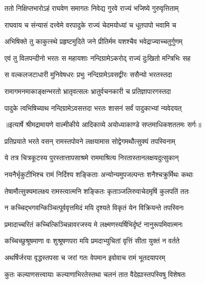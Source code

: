 \twolineshloka
{ततो निक्षिप्तभारोऽहं राघवेण समागतः}
{निवेद्य गुरवे राज्यं भजिष्ये गुरुवृत्तिताम्} %

\twolineshloka
{राघवाय च संन्यासं दत्त्वेमे वरपादुके}
{राज्यं चेदमयोध्यां च धूतपापो भवामि च} %

\twolineshloka
{अभिषिक्ते तु काकुत्स्थे प्रहृष्टमुदिते जने}
{प्रीतिर्मम यशश्चैव भवेद्राज्याच्चतुर्गुणम्} %

\twolineshloka
{एवं तु विलपन्दीनो भरतः स महायशाः}
{नन्दिग्रामेऽकरोद् राज्यं दुःखितो मन्त्रिभिः सह} %

\twolineshloka
{स वल्कलजटाधारी मुनिवेषधरः प्रभुः}
{नन्दिग्रामेऽवसद्वीरः ससैन्यो भरतस्तदा} %

\twolineshloka
{रामागमनमाकाङ्क्षन्भरतो भ्रातृवत्सलः}
{भ्रातुर्वचनकारी च प्रतिज्ञापारगस्तदा} %

\twolineshloka
{पादुके त्वभिषिच्याथ नन्दिग्रामेऽवसत्तदा}
{भरतः शासनं सर्वं पादुकाभ्यां न्यवेदयत्} %


{॥इत्यार्षे श्रीमद्रामायणे वाल्मीकीये आदिकाव्ये अयोध्याकाण्डे सप्तमाधिकशततमः सर्गः॥}


\twolineshloka
{प्रतिप्रयाते भरते वसन् रामस्तपोवने}
{लक्षयामास सोद्वेगमथौत्सुक्यं तपस्विनाम्} %

\twolineshloka
{ये तत्र चित्रकूटस्य पुरस्तात्तापसाश्रमे}
{राममाश्रित्य निरतास्तानलक्षयदुत्सुकान्} %

\twolineshloka
{नयनैर्भृकुटीभिश्च रामं निर्दिश्य शङ्किताः}
{अन्योन्यमुपजल्पन्तः शनैश्चक्रुर्मिथः कथाः} %

\twolineshloka
{तेषामौत्सुक्यमालक्ष्य रामस्त्वात्मनि शङ्कितः}
{कृताञ्जलिरुवाचेदमृषिं कुलपतिं ततः} %

\twolineshloka
{न कच्चिद्भगवन्किञ्चित्पूर्ववृत्तमिदं मयि}
{दृश्यते विकृतं येन विक्रियन्ते तपस्विनः} %

\twolineshloka
{प्रमादाच्चरितं कच्चित्किञ्चिन्नावरजस्य मे}
{लक्ष्मणस्यर्षिभिर्दृष्टं नानुरूपमिवात्मनः} %

\twolineshloka
{कच्चिच्छुश्रूषमाणा वः शुश्रूषणपरा मयि}
{प्रमदाभ्युचितां वृत्तिं सीता युक्तं न वर्तते} %

\twolineshloka
{अथर्षिर्जरया वृद्धस्तपसा च जरां गतः}
{वेपमान इवोवाच रामं भूतदयापरम्} %

\twolineshloka
{कुतः कल्याणसत्त्वायाः कल्याणाभिरतेस्तथा}
{चलनं तात वैदेह्यास्तपस्विषु विशेषतः} %

